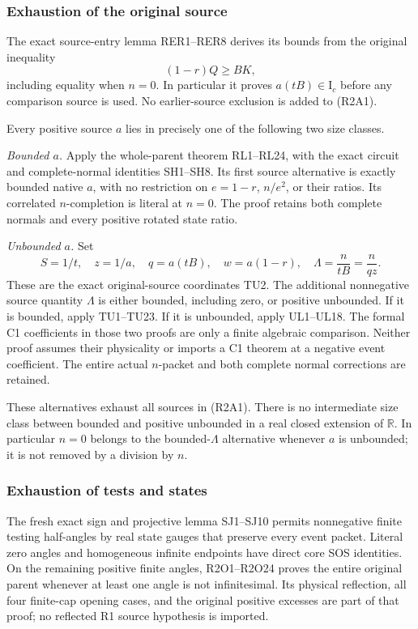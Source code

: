 \subsubsection*{Exhaustion of the original source}

The exact source-entry lemma RER1--RER8 derives its bounds from
the original inequality
\[
 (1-r)Q\geq BK,
\]
including equality when \(n=0\).  In particular it proves
\(a(tB)\in\mathrm I_c\) before any comparison source is used.
No earlier-source exclusion is added to (R2A1).

Every positive source \(a\) lies in precisely one of the following
two size classes.

\emph{Bounded \(a\).}
Apply the whole-parent theorem RL1--RL24, with the exact circuit
and complete-normal identities SH1--SH8.
Its first source alternative is exactly bounded native \(a\),
with no restriction on \(e=1-r\), \(n/e^2\), or their ratios.
Its correlated \(n\)-completion is literal at \(n=0\).
The proof retains both complete normals and every positive
rotated state ratio.

\emph{Unbounded \(a\).}
Set
\[
 S=1/t,\quad z=1/a,\quad q=a(tB),\quad
 w=a(1-r),\quad \Lambda=\frac{n}{tB}=\frac{n}{qz}.
                                                               \tag{R2A3}
\]
These are the exact original-source coordinates TU2.
The additional nonnegative source quantity \(\Lambda\) is either
bounded, including zero, or positive unbounded.
If it is bounded, apply TU1--TU23.
If it is unbounded, apply UL1--UL18.
The formal C1 coefficients in those two proofs are only a finite
algebraic comparison.  Neither proof assumes their physicality
or imports a C1 theorem at a negative event coefficient.
The entire actual \(n\)-packet and both complete normal
corrections are retained.

These alternatives exhaust all sources in (R2A1).
There is no intermediate size class between bounded and
positive unbounded in a real closed extension of \(\mathbb R\).
In particular \(n=0\) belongs to the bounded-\(\Lambda\)
alternative whenever \(a\) is unbounded; it is not removed by
a division by \(n\).

\subsubsection*{Exhaustion of tests and states}

The fresh exact sign and projective lemma SJ1--SJ10 permits
nonnegative finite testing half-angles by real state gauges
that preserve every event packet.  Literal zero angles and
homogeneous infinite endpoints have direct core SOS identities.
On the remaining positive finite angles, R2O1--R2O24 proves
the entire original parent whenever at least one angle is
not infinitesimal.  Its physical reflection, all four
finite-cap opening cases, and the original positive excesses
are part of that proof; no reflected R1 source hypothesis
is imported.


